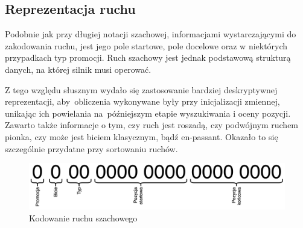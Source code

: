 \subsection{Reprezentacja ruchu}
\label{subsec:reprezentacja-ruchu}

Podobnie jak przy długiej notacji szachowej, informacjami wystarczającymi do zakodowania ruchu, jest jego pole startowe, pole docelowe oraz w niektórych przypadkach typ promocji.
Ruch szachowy jest jednak podstawową strukturą danych, na której silnik musi operować.

Z tego względu słusznym wydało się zastosowanie bardziej deskryptywnej reprezentacji, aby~obliczenia wykonywane były przy inicjalizacji zmiennej, unikając ich powielania na~późniejszym etapie wyszukiwania i oceny pozycji.
Zawarto także informacje o tym, czy ruch jest roszadą, czy podwójnym ruchem pionka, czy może jest biciem klasycznym, bądź en-passant.
Okazało to się szczególnie przydatne przy sortowaniu ruchów.

\begin{figure}[ht]
    \centering
    \includegraphics[width=1\linewidth]{rozdzialy/rozdzial01/2_reprezentacja-pozycji/rysunki/kodowanie-ruchu}
    \caption{Kodowanie ruchu szachowego}
    \label{fig:kodowanie-ruchu}
\end{figure}
